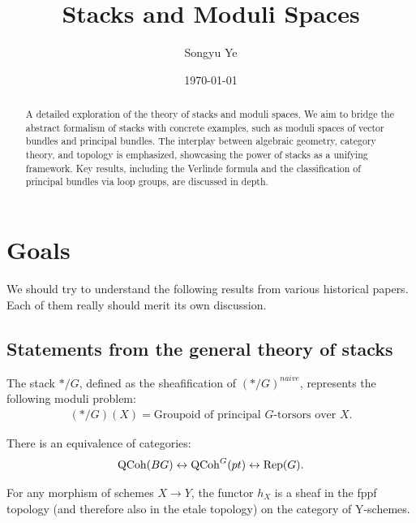 \documentclass[12pt]{article}
\begin{document}
\rhead{\today}
\cfoot{\thepage}

\title{Stacks and Moduli Spaces}

\author{Songyu Ye}
\date{\today}
\maketitle


\begin{abstract}
    A detailed exploration of the theory of stacks and moduli spaces. We aim to bridge the abstract formalism of stacks with concrete examples, such as moduli spaces of vector bundles and principal bundles. The interplay between algebraic geometry, category theory, and topology is emphasized, showcasing the power of stacks as a unifying framework. Key results, including the Verlinde formula and the classification of principal bundles via loop groups, are discussed in depth.
\end{abstract}

\tableofcontents
\section{Goals}
We should try to understand the following results from various historical papers. Each of them really should merit its own discussion.
\subsection{Statements from the general theory of stacks}

\begin{proposition}
    The stack $*/G$, defined as the sheafification of $(*/G)^{naive}$, represents the following moduli problem:
    \begin{align*}
        (*/G)(X) = \text{Groupoid of principal $G$-torsors over $X$}.
    \end{align*}
\end{proposition}

\begin{proposition}
    There is an equivalence of categories:
    \begin{align*}
        \operatorname{QCoh}(BG) \leftrightarrow \operatorname{QCoh}^G(pt) \leftrightarrow \operatorname{Rep}(G).
    \end{align*}
\end{proposition}
\begin{theorem}
    For any morphism of schemes $X\to Y$, the functor $h_X$ is a sheaf in the fppf topology (and therefore also in the etale topology) on the category of Y-schemes.
\end{theorem}
\end{document}
